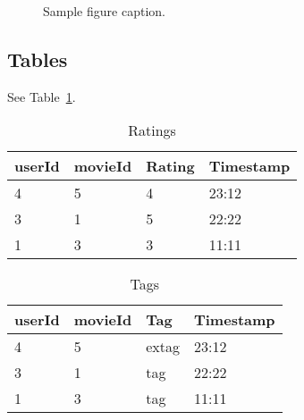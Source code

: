 \documentclass{article}
\begin{document}
\begin{figure}
  \centering
  \fbox{\rule[-.5cm]{4cm}{4cm} \rule[-.5cm]{4cm}{0cm}}
  \caption{Sample figure caption.}
  \label{fig:fig1}
\end{figure}

\subsection{Tables}

See Table~\ref{tab:table1}.

\begin{table}
 \caption{Ratings}
  \centering
  \begin{tabular}{llll}
    \toprule
    userId     & movieId     & Rating & Timestamp \\
    \midrule
    4 & 5  & 4  & 23:12   \\
    3     & 1 & 5     & 22:22 \\
    1     & 3       & 3  & 11:11\\
    \bottomrule
  \end{tabular}
  \label{tab:table1}
\end{table}

\begin{table}
 \caption{Tags}
  \centering
  \begin{tabular}{llll}
    \toprule
    userId     & movieId     & Tag & Timestamp \\
    \midrule
    4 & 5  & extag  & 23:12   \\
    3     & 1 & tag     & 22:22 \\
    1     & 3       & tag  & 11:11\\
    \bottomrule
  \end{tabular}
  \label{tab:table2}
\end{table}




  


%
%
%
%
\end{document}
